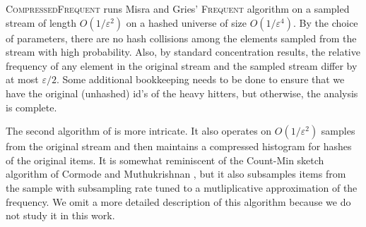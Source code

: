 \documentclass{article}
\newcommand{\eps}{\varepsilon}
\begin{document}
\begin{multicols}{2}
\textsc{CompressedFrequent} runs Misra and Gries' \textsc{Frequent} algorithm on a sampled stream of length $O(1/\eps^2)$ on a hashed universe of size $O(1/\eps^4)$. By the choice of parameters, there are no hash collisions among the elements sampled from the stream with high probability. Also, by standard concentration results, the relative frequency of any element in the original stream and the sampled stream differ by at most $\eps/2$. Some additional bookkeeping needs to be done to ensure that we have the original (unhashed) id's of the heavy hitters, but otherwise, the analysis is complete.

The second algorithm of \cite{BDW16} is more intricate. It also operates on $O(1/\eps^2)$ samples from the original stream and then maintains a compressed histogram for hashes of the original items. It is somewhat reminiscent of the Count-Min sketch algorithm of Cormode and Muthukrishnan \cite{CM05}, but it also subsamples items from the sample with subsampling rate tuned to a mutliplicative approximation of the frequency. We omit a more detailed description of this algorithm because we do not study it in this work.


\end{multicols}
\end{document}
